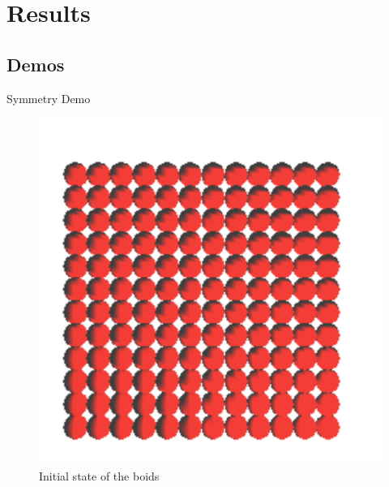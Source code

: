 \documentclass[red]{beamer}
\begin{document}
\section{Results}

\subsection{Demos}

\begin{frame}{Symmetry Demo}
	\begin{figure}[htbp]
	\begin{center}
	\includegraphics[scale=0.35]{../figures/align.pdf}
	\caption{Initial state of the boids}
	\label{alignRule}
	\end{center}
	\end{figure}
\end{frame}
\end{document}
